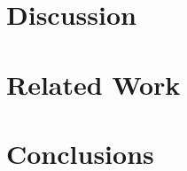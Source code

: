\documentclass[conference]{IEEEtran}
\begin{document}
\section{Discussion}

\section{Related Work}

\section{Conclusions}


\end{document}
